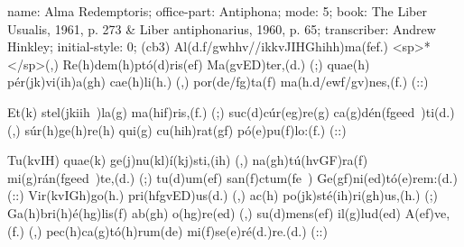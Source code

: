 name: Alma Redemptoris;
office-part: Antiphona;
mode: 5;
book: The Liber Usualis, 1961, p. 273 & Liber antiphonarius, 1960, p. 65;
transcriber: Andrew Hinkley;
initial-style: 0;
(cb3) Al(d.f/gwhhv//ikkvJIHGhihh)ma(fef.) <sp>*</sp>(,) Re(h)dem(h)ptó(d)ris(ef) Ma(gvED)ter,(d.) (;) quae(h) pér(jk)vi(ih)a(gh) cae(h)li(h.) (,) por(de/fg)ta(f) ma(h.d/ewf/gv)nes,(f.) (::)

Et(k) stel(jkiih~)la(g) ma(hif)ris,(f.) (;) suc(d)cúr(eg)re(g) ca(g)dén(fgeed~)ti(d.) (,) súr(h)ge(h)re(h) qui(g) cu(hih)rat(gf) pó(e)pu(f)lo:(f.) (::)

Tu(kvIH) quae(k) ge(j)nu(kl)í(kj)sti,(ih) (,) na(gh)tú(hvGF)ra(f) mi(g)rán(fgeed~)te,(d.) (;) tu(d)um(ef) san(f)ctum(fe~) Ge(gf)ni(ed)tó(e)rem:(d.) (::) Vir(kvIGh)go(h.) pri(hfgvED)us(d.) (,) ac(h) po(jk)sté(ih)ri(gh)us,(h.) (;) Ga(h)bri(h)é(hg)lis(f) ab(gh) o(hg)re(ed) (,) su(d)mens(ef) il(g)lud(ed) A(ef)ve,(f.) (,) pec(h)ca(g)tó(h)rum(de) mi(f)se(e)ré(d.)re.(d.) (::)
